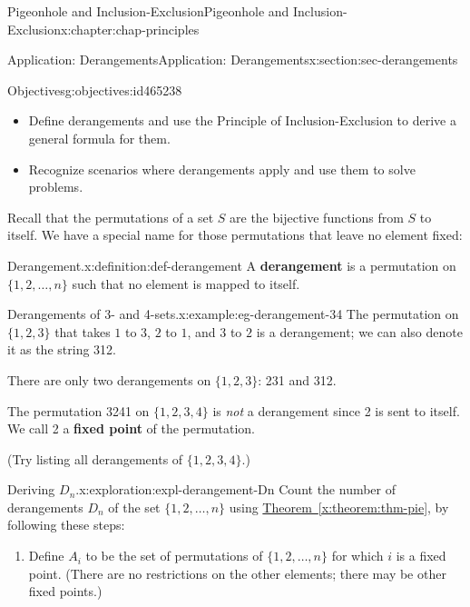 \documentclass[oneside,10pt,]{book}
\newcommand{\xreffont}{\relax}
\newcommand{\terminology}[1]{\textbf{#1}}
\numberwithin{equation}{section}
\begin{document}
\begin{chapterptx}{Pigeonhole and Inclusion-Exclusion}{}{Pigeonhole and Inclusion-Exclusion}{}{}{x:chapter:chap-principles}
%
%
\typeout{************************************************}
\typeout{************************************************}
%
\begin{sectionptx}{Application: Derangements}{}{Application: Derangements}{}{}{x:section:sec-derangements}
\begin{objectives}{Objectives}{g:objectives:id465238}
%
\begin{itemize}[label=\textbullet]
\item{}Define derangements and use the Principle of Inclusion-Exclusion to derive a general formula for them.%
\item{}Recognize scenarios where derangements apply and use them to solve problems.%
\end{itemize}
\end{objectives}
Recall that the permutations of a set \(S\) are the bijective functions from \(S\) to itself. We have a special name for those permutations that leave no element fixed:%
\begin{definition}{Derangement.}{x:definition:def-derangement}%
A \terminology{derangement} is a permutation on \(\{1,2,\ldots,n\}\) such that no element is mapped to itself.%
\end{definition}
\begin{example}{Derangements of 3- and 4-sets.}{x:example:eg-derangement-34}%
The permutation on \(\{1,2,3\}\) that takes \(1\) to \(3\), \(2\) to \(1\), and \(3\) to \(2\) is a derangement; we can also denote it as the string 312.%
\par
There are only two derangements on \(\{1,2,3\}\): 231 and 312.%
\par
The permutation 3241 on \(\{1,2,3,4\}\) is \emph{not} a derangement since 2 is sent to itself. We call 2 a \terminology{fixed point} of the permutation.%
\par
(Try listing all derangements of \(\{1,2,3,4\}\).)%
\end{example}
\begin{exploration}{Deriving \(D_n\).}{x:exploration:expl-derangement-Dn}%
Count the number of derangements \(D_n\) of the set \(\{1,2,\ldots,n\}\) using \hyperref[x:theorem:thm-pie]{Theorem~{\xreffont\ref{x:theorem:thm-pie}}}, by following these steps: \label{g:notation:id465772}%
\begin{enumerate}[font=\bfseries,label=(\alph*),ref=\alph*]
\item{}Define \(A_i\) to be the set of permutations of \(\{1,2,\ldots,n\}\) for which \(i\) is a fixed point. (There are no restrictions on the other elements; there may be other fixed points.)%

\end{enumerate}
\end{exploration}
\end{sectionptx}
\end{chapterptx}
\end{document}
